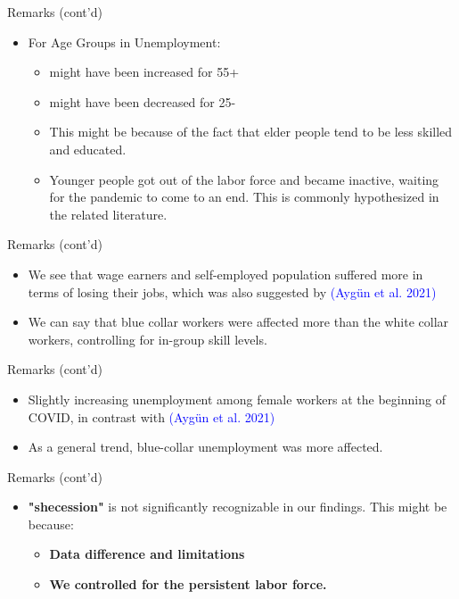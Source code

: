 \documentclass[
	11pt, %
]{beamer}
\begin{document}
\begin{frame}{Remarks (cont'd)}
\begin{itemize}
    \item For Age Groups in Unemployment:
    \begin{itemize}
        \item might have been increased for 55+
         \item might have been decreased for 25-
    \end{itemize}
   
    \begin{itemize}
        \item This might be because of the fact that elder people tend to be less skilled and educated.
        \item Younger people got out of the labor force and became inactive, waiting for the pandemic to come to an end. This is commonly hypothesized in the related literature.
    \end{itemize}
    
\end{itemize}
    
\end{frame}

\begin{frame}{Remarks (cont'd)}
    

\begin{itemize}
    \item We see that wage earners and self-employed population suffered more in terms of losing their jobs, which was also suggested by \textcolor{blue}{(Aygün et al. 2021)}
    \item We can say that blue collar workers were affected more than the white collar workers, controlling for in-group skill levels.
\end{itemize}
\end{frame}
\begin{frame}{Remarks (cont'd)}
    \begin{itemize}
        \item Slightly increasing unemployment among female workers at the beginning of COVID, in contrast with \textcolor{blue}{(Aygün et al. 2021)}
        \item As a general trend, blue-collar unemployment was more affected.
        
    \end{itemize}
\end{frame}
\begin{frame}{Remarks (cont'd)}
\begin{itemize}
    \item \textbf{"shecession"} is not significantly recognizable in our findings. This might be because:
    \begin{itemize}
    \item \textbf{Data difference and limitations}
    \item \textbf{We controlled for the persistent labor force.}
        
    \end{itemize}
\end{itemize}

    
\end{frame}
\end{document}

